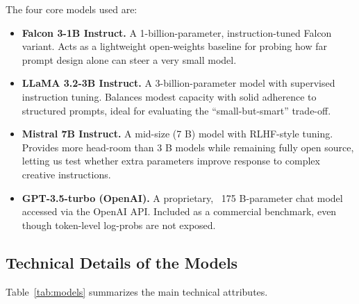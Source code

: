 \documentclass[12pt]{article}
\begin{document}
The four core models used are:
\begin{itemize}
    \item \textbf{Falcon 3-1B Instruct.} A 1-billion-parameter, instruction-tuned Falcon variant.  
          Acts as a lightweight open-weights baseline for probing how far prompt design alone
          can steer a very small model.

    \item \textbf{LLaMA 3.2-3B Instruct.} A 3-billion-parameter model with supervised instruction tuning.  
          Balances modest capacity with solid adherence to structured prompts,
          ideal for evaluating the “small-but-smart” trade-off.

    \item \textbf{Mistral 7B Instruct.} A mid-size (7 B) model with RLHF-style tuning.  
          Provides more head-room than 3 B models while remaining fully open source,
          letting us test whether extra parameters improve response to complex creative instructions.

    \item \textbf{GPT-3.5-turbo (OpenAI).} A proprietary, ~175 B-parameter chat model accessed via the
          OpenAI API.  Included as a commercial benchmark, even though token-level log-probs
          are not exposed.
\end{itemize}

\subsection{Technical Details of the Models}
Table~\ref{tab:models} summarizes the main technical attributes.

\begin{table}[h]
\centering
\caption{Summary of the four language models employed.}
\label{tab:models}
\end{table}
\end{document}
